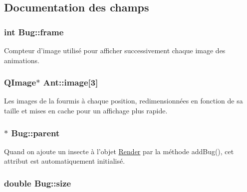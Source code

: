 \subsection{Documentation des champs}
\hypertarget{classBug_ad7e3597cf049f1051be94fcaf2fd3598}{
\subsubsection[{frame}]{\setlength{\rightskip}{0pt plus 5cm}int {\bf Bug::frame}}}
\label{classBug_ad7e3597cf049f1051be94fcaf2fd3598}
Compteur d'image utilisé pour afficher successivement chaque image des animations. \hypertarget{classAnt_af7d498fe6677833f371d3d9561727678}{
\subsubsection[{image}]{\setlength{\rightskip}{0pt plus 5cm}QImage$\ast$ {\bf Ant::image}\mbox{[}3\mbox{]}}}
\label{classAnt_af7d498fe6677833f371d3d9561727678}
Les images de la fourmis à chaque position, redimensionnées en fonction de sa taille et mises en cache pour un affichage plus rapide. \hypertarget{classBug_a7a93aae4e4b7a215c94ff85d0bd6e26d}{
\subsubsection[{parent}]{$\ast$ {\bf Bug::parent}}}
\label{classBug_a7a93aae4e4b7a215c94ff85d0bd6e26d}
Quand on ajoute un insecte à l'objet \hyperlink{classRender}{Render} par la méthode addBug(), cet attribut est automatiquement initialisé. \hypertarget{classBug_a27a0f0b84d15525e409955509e6e3c42}{
\subsubsection[{size}]{\setlength{\rightskip}{0pt plus 5cm}double {\bf Bug::size}}}
\label{classBug_a27a0f0b84d15525e409955509e6e3c42}
